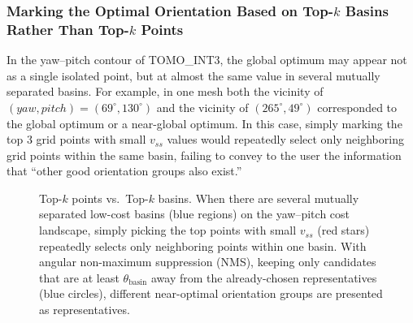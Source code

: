 \documentclass[11pt,a4paper]{article}
\begin{document}
\subsubsection{Marking the Optimal Orientation Based on Top-$k$ Basins Rather Than Top-$k$ Points}

In the yaw--pitch contour of TOMO\_INT3, the global optimum may appear not as a single isolated point, but
at almost the same value in several mutually separated basins.
For example, in one mesh both the vicinity of $(yaw,pitch)=(69^\circ,130^\circ)$ and
the vicinity of $(265^\circ,49^\circ)$ corresponded to the global optimum or a near-global optimum.
In this case, simply marking the top 3 grid points with small $v_{ss}$ values
would repeatedly select only neighboring grid points within the same basin,
failing to convey to the user the information that ``other good orientation groups also exist.''

\begin{figure}[H]
\centering
{}
\caption{Top-$k$ points vs.\ Top-$k$ basins. When there are several mutually separated low-cost basins (blue regions) on the
yaw--pitch cost landscape, simply picking the top points with small $v_{ss}$ (red stars) repeatedly selects only neighboring points
within one basin. With angular non-maximum suppression (NMS), keeping only candidates that are at least $\theta_{\mathrm{basin}}$
away from the already-chosen representatives (blue circles), different near-optimal orientation groups are presented as representatives.}
\label{fig:basin-nms}
\end{figure}
\end{document}

